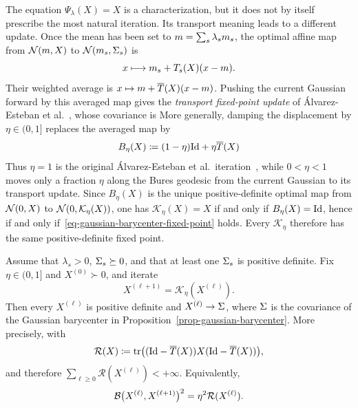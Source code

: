The equation $\Psi_\lambda(X)=X$ is a characterization, but it does not by itself prescribe the most natural iteration. Its transport meaning leads to a different update. Once the mean has been set to $m=\sum_s\lambda_sm_s$, the optimal affine map from $\mathcal{N}(m,X)$ to $\mathcal{N}(m_s,\Sigma_s)$ is
\[
	x\longmapsto m_s+T_s(X)(x-m).
\]
Their weighted average is $x\mapsto m+\overline T(X)(x-m)$. Pushing the current Gaussian forward by this averaged map gives the \emph{transport fixed-point update} of \'Alvarez-Esteban et al.~\cite{alvarez2016fixed}, whose covariance is
More generally, damping the displacement by $\eta\in(0,1]$ replaces the averaged map by
\[
	B_\eta(X)
	\coloneqq
	(1-\eta)\mathrm{Id}+\eta\overline T(X)
\]
Thus $\eta=1$ is the original \'Alvarez-Esteban et al.\ iteration~\cite{alvarez2016fixed}, while $0<\eta<1$ moves only a fraction $\eta$ along the Bures geodesic from the current Gaussian to its transport update. Since $B_\eta(X)$ is the unique positive-definite optimal map from $\mathcal{N}(0,X)$ to $\mathcal{N}(0,\mathcal K_\eta(X))$, one has $\mathcal K_\eta(X)=X$ if and only if $B_\eta(X)=\mathrm{Id}$, hence if and only if~\eqref{eq-gaussian-barycenter-fixed-point} holds. Every $\mathcal K_\eta$ therefore has the same positive-definite fixed point.

\begin{prop}\label{prop-gaussian-barycenter-fixed-point-convergence}
	Assume that $\lambda_s>0$, $\Sigma_s\succeq0$, and that at least one $\Sigma_s$ is positive definite. Fix $\eta\in(0,1]$ and $X^{(0)}\succ0$, and iterate
	\[
		X^{(\ell+1)}=\mathcal K_\eta(X^{(\ell)}).
	\]
	Then every $X^{(\ell)}$ is positive definite and $X^{(\ell)}\to\Sigma$, where $\Sigma$ is the covariance of the Gaussian barycenter in Proposition~\ref{prop-gaussian-barycenter}. More precisely, with
	\[
		\mathcal R(X)
		\coloneqq
		\operatorname{tr}\bigl((\mathrm{Id}-\overline T(X))X(\mathrm{Id}-\overline T(X))\bigr),
	\]
	and therefore $\sum_{\ell\geq0}\mathcal R(X^{(\ell)})<+\infty$. Equivalently,
	\[
		\mathcal{B}\bigl(X^{(\ell)},X^{(\ell+1)}\bigr)^2
		=
		\eta^2\mathcal R(X^{(\ell)}).
	\]
\end{prop}

